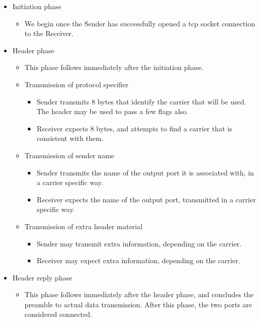 \documentclass[a4]{article}
\begin{document}
\begin{itemize}

\item Initiation phase
  \begin{itemize}
  \item We begin once the Sender has
    successfully opened a tcp socket connection to the Receiver.
  \end{itemize}

\item Header phase
  \begin{itemize}
  \item This phase follows immediately after the initiation phase.
  \item Transmission of protocol specifier
    \begin{itemize}
      \item Sender transmits 8 bytes that identify the carrier
	that will be used.  The header may be used to pass a 
	few flags also.
      \item Receiver expects 8 bytes, and attempts to find a
	carrier that is consistent with them.
    \end{itemize}
  \item Transmission of sender name
    \begin{itemize}
      \item Sender transmits the name of the output port
	it is associated with, in a carrier specific way.
      \item Receiver expects the name of the output port,
	transmitted in a carrier specific way.
    \end{itemize}
  \item Transmission of extra header material
    \begin{itemize}
      \item Sender may transmit extra information, depending on
      the carrier.
      \item Receiver may expect extra information, depending on
      the carrier.
    \end{itemize}
  \end{itemize}

\item Header reply phase

  \begin{itemize}
    
  \item This phase follows immediately after the header phase, and
    concludes the preamble to actual data transmission.  After this
    phase, the two ports are considered connected.
    

\end{itemize}
\end{itemize}
\end{document}
